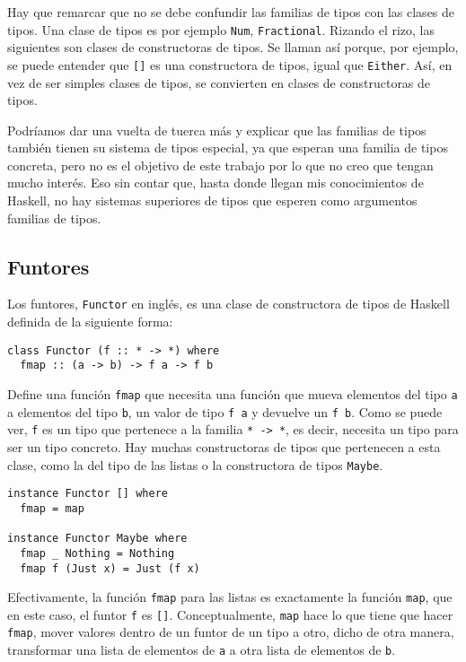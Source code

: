 \documentclass[class=article, crop=false]{standalone}
\begin{document}
Hay que remarcar que no se debe confundir las familias de tipos con las clases de tipos. Una
clase de tipos es por ejemplo \verb`Num`, \verb`Fractional`. Rizando el rizo, las siguientes
son clases de constructoras de tipos. Se llaman así porque, por ejemplo, se puede entender
que \verb`[]` es una constructora de tipos, igual que \verb`Either`. Así, en vez de ser
simples clases de tipos, se convierten en clases de constructoras de tipos.

Podríamos dar una vuelta de tuerca más y explicar que las familias de tipos también tienen
su sistema de tipos especial, ya que esperan una familia de tipos concreta, pero no es el
objetivo de este trabajo por lo que no creo que tengan mucho interés. Eso sin contar que,
hasta donde llegan mis conocimientos de Haskell, no hay sistemas superiores de tipos que
esperen como argumentos familias de tipos.

\subsection{Funtores}
Los funtores, \verb`Functor` en inglés, es una clase de constructora de tipos de Haskell
definida de la siguiente forma:

\begin{verbatim}
class Functor (f :: * -> *) where
  fmap :: (a -> b) -> f a -> f b
\end{verbatim}

Define una función \verb`fmap` que necesita una función que mueva elementos del tipo \verb`a`
a elementos del tipo \verb`b`, un valor de tipo \verb`f a` y devuelve un \verb`f b`. Como se
puede ver, \verb`f` es un tipo que pertenece a la familia \verb`* -> *`, es decir, necesita
un tipo para ser un tipo concreto. Hay muchas constructoras de tipos que pertenecen a esta
clase, como la del tipo de las listas o la constructora de tipos \verb`Maybe`.

\begin{verbatim}
instance Functor [] where
  fmap = map

instance Functor Maybe where
  fmap _ Nothing = Nothing
  fmap f (Just x) = Just (f x)
\end{verbatim}

Efectivamente, la función \verb`fmap` para las listas es exactamente la función \verb`map`,
que en este caso, el funtor \verb`f` es \verb`[]`. Conceptualmente, \verb`map` hace lo que
tiene que hacer \verb`fmap`, mover valores dentro de un funtor de un tipo a otro, dicho de
otra manera, transformar una lista de elementos de \verb`a` a otra lista de elementos de
\verb`b`.
\end{document}
